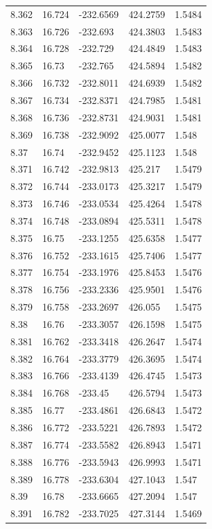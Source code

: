 \begin{tabular}{lllll}
8.362 & 16.724 & -232.6569 & 424.2759 & 1.5484 \\
8.363 & 16.726 & -232.693 & 424.3803 & 1.5483 \\
8.364 & 16.728 & -232.729 & 424.4849 & 1.5483 \\
8.365 & 16.73 & -232.765 & 424.5894 & 1.5482 \\
8.366 & 16.732 & -232.8011 & 424.6939 & 1.5482 \\
8.367 & 16.734 & -232.8371 & 424.7985 & 1.5481 \\
8.368 & 16.736 & -232.8731 & 424.9031 & 1.5481 \\
8.369 & 16.738 & -232.9092 & 425.0077 & 1.548 \\
8.37 & 16.74 & -232.9452 & 425.1123 & 1.548 \\
8.371 & 16.742 & -232.9813 & 425.217 & 1.5479 \\
8.372 & 16.744 & -233.0173 & 425.3217 & 1.5479 \\
8.373 & 16.746 & -233.0534 & 425.4264 & 1.5478 \\
8.374 & 16.748 & -233.0894 & 425.5311 & 1.5478 \\
8.375 & 16.75 & -233.1255 & 425.6358 & 1.5477 \\
8.376 & 16.752 & -233.1615 & 425.7406 & 1.5477 \\
8.377 & 16.754 & -233.1976 & 425.8453 & 1.5476 \\
8.378 & 16.756 & -233.2336 & 425.9501 & 1.5476 \\
8.379 & 16.758 & -233.2697 & 426.055 & 1.5475 \\
8.38 & 16.76 & -233.3057 & 426.1598 & 1.5475 \\
8.381 & 16.762 & -233.3418 & 426.2647 & 1.5474 \\
8.382 & 16.764 & -233.3779 & 426.3695 & 1.5474 \\
8.383 & 16.766 & -233.4139 & 426.4745 & 1.5473 \\
8.384 & 16.768 & -233.45 & 426.5794 & 1.5473 \\
8.385 & 16.77 & -233.4861 & 426.6843 & 1.5472 \\
8.386 & 16.772 & -233.5221 & 426.7893 & 1.5472 \\
8.387 & 16.774 & -233.5582 & 426.8943 & 1.5471 \\
8.388 & 16.776 & -233.5943 & 426.9993 & 1.5471 \\
8.389 & 16.778 & -233.6304 & 427.1043 & 1.547 \\
8.39 & 16.78 & -233.6665 & 427.2094 & 1.547 \\
8.391 & 16.782 & -233.7025 & 427.3144 & 1.5469 \\

\end{tabular}
